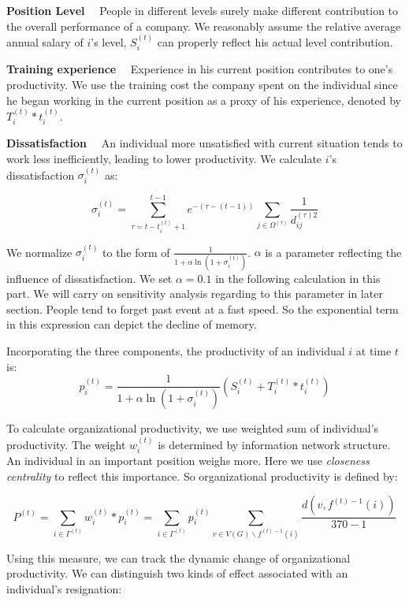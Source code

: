 \documentclass[tcn = 37075, sheet = false, abstract = false]{mcmthesis}
\begin{document}
\noindent \textbf{Position Level} \ \ People in different levels surely make different contribution to the overall performance of a company. We reasonably assume the relative average annual salary of $i$'s level, $S_i^{(t)}$ can properly reflect his actual level contribution.


\noindent \textbf{Training experience} \ \ Experience in his current position contributes to one's productivity. We use the training cost the company spent on the individual since he began working in the current position as a proxy of his experience, denoted by $T_i^{(t)}*t_i^{(t)}$.


\noindent \textbf{Dissatisfaction} \ \ An individual more unsatisfied with current situation tends to work less inefficiently, leading to lower productivity. We calculate $i$'s dissatisfaction $\sigma_i^{(t)}$ as:

$$\displaystyle \sigma_i^{(t)}=\sum_{\tau=t-t_i^{(t)}+1}^{t-1}e^{-(\tau-(t-1))}\sum_{j\in \Omega^{(\tau)}}\frac{1}{d_{ij}^{(\tau)2}}$$

We normalize $\sigma_i^{(t)}$ to the form of $\frac{1}{1+\alpha\ln{(1+\sigma_i^{(t)})}}$. $\alpha$ is a parameter reflecting the influence of dissatisfaction. We set $\displaystyle \alpha = 0.1$ in the following calculation in this part. We will carry on sensitivity analysis regarding to this parameter in later section. People tend to forget past event at a fast speed\cite{ebbighaus1913memory}. So the exponential term in this expression can depict the decline of memory.

Incorporating the three components, the productivity of an individual $i$ at time $t$ is:
$$ p_i^{(t)}=\frac{1}{1+\alpha\ln{(1+\sigma_i^{(t)})}}(S_i^{(t)}+T_i^{(t)}*t_i^{(t)})$$

To calculate organizational productivity, we use weighted sum of individual's productivity. The weight $w_i^{(t)}$ is determined by information network structure. An individual in an important position weighs more. Here we use \textit{closeness centrality} to reflect this importance. So organizational productivity is defined by:

$$\displaystyle P^{(t)}=\sum\limits_{i\in\Gamma^{(t)}} w_i^{(t)}*p_i^{(t)}=\sum\limits_{i\in\Gamma^{(t)}}p_i^{(t)}\sum\limits_{v\in V(G)\backslash f^{(t)-1}(i)}\frac{d(v,f^{(t)-1}(i))}{370-1}$$

Using this measure, we can track the dynamic change of organizational productivity. We can distinguish two kinds of effect associated with an individual's resignation:
\end{document}
